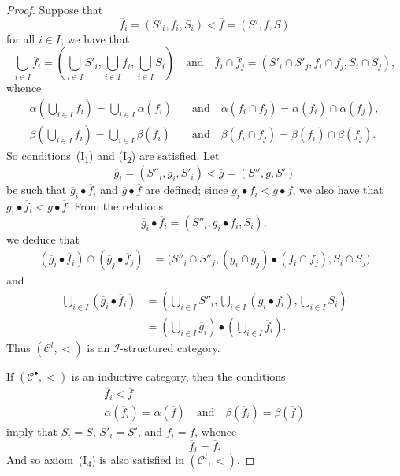 \documentclass[a4paper,fleqn]{article}
\theoremstyle{plain}
\theoremstyle{definition}
\newcommand{\oldpage}[1]{{\marginpar{\footnotesize$\bigg\vert$\,\,\,\,\textit{p.~#1}}}}
\newcommand{\textand}{\quad\text{and}\quad}
\newcommand{\CC}{\mathcal{C}}
\newcommand{\II}{\mathcal{I}}
\newcommand{\smallbullet}{\bullet}
\begin{document}
\begin{proof}
  \oldpage{408}
  Suppose that
  \[
    \overline{f}_i
    = (S'_i,f_i,S_i)
    < \overline{f}
    = (S',f,S)
  \]
  for all $i\in I$;
  we have that
  \[
    \bigcup_{i\in I}\overline{f}_i
    = \left(\bigcup_{i\in I}S'_i, \bigcup_{i\in I}f_i, \bigcup_{i\in I}S_i\right)
    \textand
    \bar{f}_i\cap\bar{f}_j
    = (S'_i\cap S'_j, f_i\cap f_j, S_i\cap S_j),
  \]
  whence
  \[
    \begin{aligned}
      \alpha\left(\bigcup_{i\in I}\overline{f}_i\right)
      = \bigcup_{i\in I}\alpha(\overline{f}_i)
      &\textand
      \alpha(\overline{f}_i\cap\overline{f}_j)
      = \alpha(\overline{f}_i)\cap\alpha(\overline{f}_j),
    \\\beta\left(\bigcup_{i\in I}\overline{f}_i\right)
      = \bigcup_{i\in I}\beta(\overline{f}_i)
      &\textand
      \beta(\overline{f}_i\cap\overline{f}_j)
      = \beta(\overline{f}_i)\cap\beta(\overline{f}_j).
    \end{aligned}
  \]
  So conditions~(I\textsubscript{1}) and (I\textsubscript{2}) are satisfied.
  Let
  \[
    \overline{g}_i
    = (S''_i,g_i,S'_i)
    < \overline{g}
    = (S'',g,S')
  \]
  be such that $\overline{g}_i\smallbullet\overline{f}_i$ and $\overline{g}\smallbullet\overline{f}$ are defined;
  since $g_i\smallbullet f_i<g\smallbullet f$, we also have that $\overline{g}_i\smallbullet\overline{f}_i<\overline{g}\smallbullet\overline{f}$.
  From the relations
  \[
    \overline{g}_i\smallbullet\overline{f}_i
    = (S''_i,g_i\smallbullet f_i,S_i),
  \]
  we deduce that
  \[
    \begin{aligned}
      (\overline{g}_i\smallbullet\overline{f}_i)\cap(\overline{g}_j\smallbullet\overline{f}_j)
      &= \big(
        S''_i\cap S''_j,
        (g_i\cap g_j)\smallbullet(f_i\cap f_j),
        S_i\cap S_j
      \big)
    \end{aligned}
  \]
  and
  \[
    \begin{aligned}
      \bigcup_{i\in I}(\overline{g}_i\smallbullet\overline{f}_i)
      &= \left(
        \bigcup_{i\in I}S''_i,
        \bigcup_{i\in I}(g_i\smallbullet f_i),
        \bigcup_{i\in I}S_i
      \right)
    \\&= \left(\bigcup_{i\in I}\overline{g}_i\right)\smallbullet\left(\bigcup_{i\in I}\overline{f}_i\right).
    \end{aligned}
  \]
  Thus $(\CC^l,<)$ is an $\II$-structured category.

  If $(\CC^\smallbullet,<)$ is an inductive category, then the conditions
  \[
    \begin{gathered}
      \overline{f}_i<\overline{f}
    \\\alpha(\overline{f}_i)=\alpha(\overline{f})
      \textand
      \beta(\overline{f}_i)=\beta(\overline{f})
    \end{gathered}
  \]
  imply that $S_i=S$, $S'_i=S'$, and $f_i=f$, whence
  \[
    \overline{f}_i
    = \overline{f}.
  \]
  And so axiom~(I\textquotesingle\!\textsubscript{4}) is also satisfied in $(\CC^l,<)$.


\end{proof}
\end{document}
